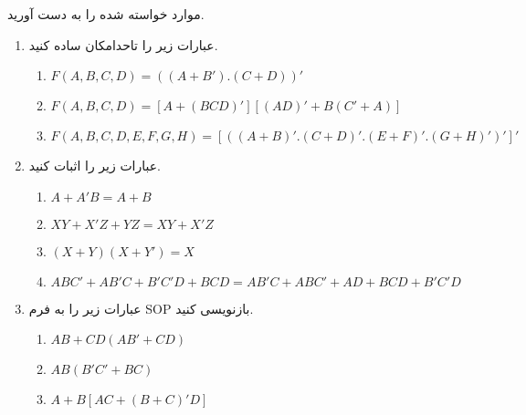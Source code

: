 موارد خواسته شده را به دست آورید.

\begin{enumerate}
	\item 
	عبارات زیر را تاحدامکان ساده کنید.
	
	\begin{latin}
		\begin{enumerate}
			\item $F(A, B, C, D) = ((A + B').(C + D))'$
			
			\item $F(A,B,C,D) = [A + (BCD)' ][ (AD)' + B(C' + A) ]$
			
			\item $F(A,B,C,D,E,F,G,H) = [ ((A + B)' . (C + D)' . (E + F)' . (G + H)' )' ]'$
		\end{enumerate}
	\end{latin}
	
	
	\item	
	عبارات زیر را اثبات کنید.
	\begin{latin}
		\begin{enumerate}
			\item $A + A'B = A + B$
			
			\item $XY + X' Z + YZ = XY + X' Z$
			
			\item $(X + Y) (X + Y') = X$
			
			\item $ABC′ + AB'C + B'C'D + BCD = AB'C + ABC' + AD + BCD + B'C'D$
		\end{enumerate}
	\end{latin}
	
	
	\item 
	عبارات زیر را به فرم SOP بازنویسی کنید.
	\begin{latin}
		\begin{enumerate}
			\item $AB + CD (AB' + CD)$
			
			\item $AB (B' C' + BC)$
			
			\item $A + B[AC + (B + C)' D]$
		\end{enumerate}
	\end{latin}
	
	
	
	
\end{enumerate}
